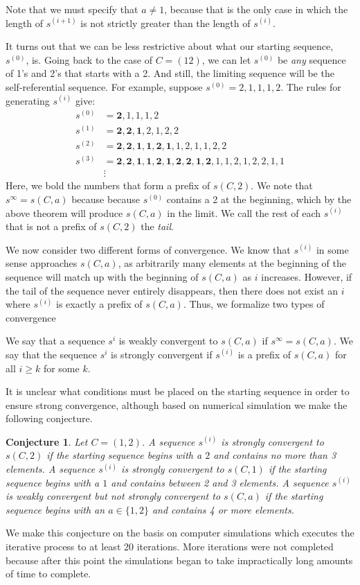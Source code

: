 \documentclass[runningheads,a4paper]{llncs}
\newtheorem{conj}[theorem]{Conjecture}
\begin{document}
Note that we must specify that $a \neq 1$, because that is the only case in which the length of $s^{(i+1)}$ is not strictly greater than the length of $s^{(i)}$. 

It turns out that we can be less restrictive about what our starting sequence, $s^{(0)}$, is. Going back to the case of $C = (1 2)$, we can let $s^{(0)}$ be \emph{any} sequence of 1's and 2's that starts with a 2. And still, the limiting sequence will be the self-referential sequence.
For example, suppose $s^{(0)} = 2,1,1,1,2$. The rules for generating $s^{(i)}$ give:
\begin{align*}
s^{(0)}&= \mathbf{2},1,1,1,2\\
s^{(1)} &= \mathbf{2,2,1},2,1,2,2\\
s^{(2)} &= \mathbf{2,2,1,1,2,1},1,2,1,1,2,2\\
s^{(3)} &= \mathbf{2,2,1,1,2,1,2,2,1,2},1,1,2,1,2,2,1,1\\
&\vdots
\end{align*}
Here, we bold the numbers that form a prefix of $s(C,2)$. We note that $s^\infty = s(C,a)$ because because $s^{(0)}$ contains a 2 at the beginning, which by the above theorem will produce $s(C,a)$ in the limit. We call the rest of each $s^{(i)}$ that is not a prefix of $s(C,2)$ the \emph{tail}.

We now consider two different forms of convergence. We know that $s^{(i)}$ in some sense approaches $s(C,a)$, as arbitrarily many elements at the beginning of the sequence will match up with the beginning of $s(C,a)$ as $i$ increases. However, if the tail of the sequence never entirely disappears, then there does not exist an $i$ where $s^{(i)}$ is exactly a prefix of $s(C,a)$. Thus, we formalize two types of convergence
\begin{definition} We say that a sequence $s^{i}$ is weakly convergent to $s(C,a)$ if $s^\infty = s(C,a)$. We say that the sequence $s^{i}$ is strongly convergent if $s^{(i)}$ is a prefix of $s(C,a)$ for all $i \geq k$ for some $k$.
\end{definition}
It is unclear what conditions must be placed on the starting sequence in order to ensure strong convergence, although based on numerical simulation we make the following conjecture. 

\begin{conj} Let $C = (1,2)$. A sequence $s^{(i)}$ is strongly convergent to $s(C, 2)$ if the starting sequence begins with a $2$ and contains no more than 3 elements. A sequence $s^{(i)}$ is strongly convergent to $s(C, 1)$ if the starting sequence begins with a $1$ and contains between 2 and 3 elements. A sequence $s^{(i)}$ is weakly convergent but not strongly convergent to $s(C, a)$ if the starting sequence begins with an $a \in \{1,2\}$ and contains 4 or more elements.
\end{conj} 
We make this conjecture on the basis on computer simulations which executes the iterative process to at least 20 iterations. More iterations were not completed because after this point the simulations began to take impractically long amounts of time to complete. 
\end{document}
